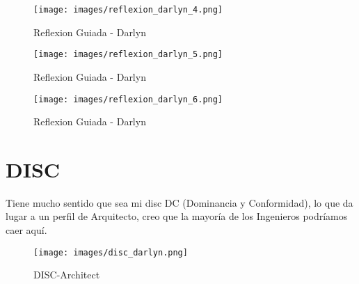 \begin{figure}[H]
  \centering
  \texttt{[image: images/reflexion\_darlyn\_4.png]}
  \caption{Reflexion Guiada - Darlyn}
  \label{fig:reflexion_darlyn_4}
\end{figure}

\begin{figure}[H]
  \centering
  \texttt{[image: images/reflexion\_darlyn\_5.png]}
  \caption{Reflexion Guiada - Darlyn}
  \label{fig:reflexion_darlyn_5}
\end{figure}

\begin{figure}[H]
  \centering
  \texttt{[image: images/reflexion\_darlyn\_6.png]}
  \caption{Reflexion Guiada - Darlyn}
  \label{fig:reflexion_darlyn_6}
\end{figure}


\section*{DISC}
Tiene mucho sentido que sea mi disc DC (Dominancia y Conformidad), lo que da lugar
a un perfil de Arquitecto, creo que la mayoría de los Ingenieros podríamos caer aquí.

\begin{figure}[H]
  \centering
  \texttt{[image: images/disc\_darlyn.png]}
  \caption{DISC-Architect}
  \label{fig:disc}
\end{figure}